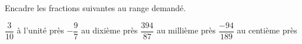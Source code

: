 %
%
Encadre les fractions suivantes au range demandé.
  \begin{tasks}
    \task $\dfrac{3}{10}$ à l'unité près
    \task $- \dfrac{9}{7}$ au dixième près
    \task $\dfrac{394}{87}$ au millième près
    \task $\dfrac{- 94}{189}$ au centième près
  \end{tasks}
